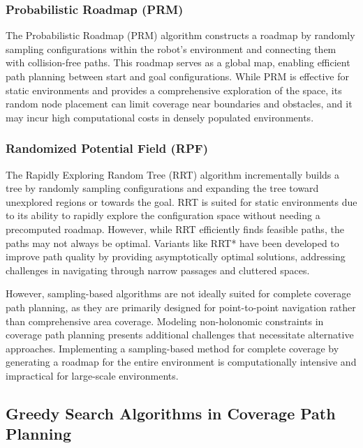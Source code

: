 \subsubsection{Probabilistic Roadmap (PRM)}

The Probabilistic Roadmap (PRM) algorithm constructs a roadmap by randomly sampling configurations within the robot's environment and connecting them with collision-free paths. This roadmap serves as a global map, enabling efficient path planning between start and goal configurations. While PRM is effective for static environments and provides a comprehensive exploration of the space, its random node placement can limit coverage near boundaries and obstacles, and it may incur high computational costs in densely populated environments.


\subsubsection{Randomized Potential Field (RPF)}

The Rapidly Exploring Random Tree (RRT) algorithm incrementally builds a tree by randomly sampling configurations and expanding the tree toward unexplored regions or towards the goal. RRT is suited for static environments due to its ability to rapidly explore the configuration space without needing a precomputed roadmap. However, while RRT efficiently finds feasible paths, the paths may not always be optimal. Variants like RRT* have been developed to improve path quality by providing asymptotically optimal solutions, addressing challenges in navigating through narrow passages and cluttered spaces.

\vspace{3mm}


However, sampling-based algorithms are not ideally suited for complete coverage path planning, as they are primarily designed for point-to-point navigation rather than comprehensive area coverage. Modeling non-holonomic constraints in coverage path planning presents additional challenges that necessitate alternative approaches. Implementing a sampling-based method for complete coverage by generating a roadmap for the entire environment is computationally intensive and impractical for large-scale environments.



\subsection{Greedy Search Algorithms in Coverage Path Planning}

